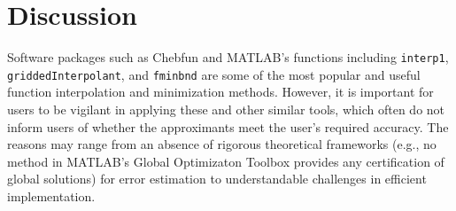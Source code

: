 \documentclass[review]{elsarticle}
\newcommand{\abstol}{\varepsilon}
\theoremstyle{definition}
\newtheorem{exmp}{Example}
\newcommand{\funappxg}{\texttt{funappx\_g}\xspace}
\newcommand{\funming}{\texttt{funmin\_g\xspace}}
\newcommand{\integralg}{\texttt{integral\_g\xspace}}
\begin{document}
\begin{comment}
\begin{exmp}
In this example, we consider the function $f_4(x) = sin(10 \pi x^4) + x$, which
is increasing oscillating over the interval $[0,2]$. We use \funappxg, \funming,
and \integralg to approximate the function, locate its global minimum, and
estimate its integral with $\abstol = 10^{-8}$. With $1,972,359$ points,
\funappxg can approximate $f_4$ uniformly accurate as shown in
Figure~\ref{f4fig}(a). The true global minimum is $(0.6212340312,
-0.3782149854)$ and the absolute approximation error of \funming using
$n=2,022,621$ points is $(1.4\times 10^{-7}, 4.7\times 10^{-11})$. The integral
$\int_{0}^{2} f_4 (x) dx = 2.145517314$ and the approximation error of
\integralg is $4.7\times10^{-10}$ using $4,965,641$ points.

\begin{figure}[bt]
\centering
\texttt{[image: figure/f4\_funappx\_error.eps]} \hspace{-5ex}
\texttt{[image: figure/f4\_funmin\_g.eps]}
\caption{The example $f_4$ with errors of interpolants from \funappxg (left) and
minimum found by \funming (right).}
\label{f4fig}
\end{figure}
\end{exmp}
\end{comment}


\begin{comment}
Our algorithm is readily extensible to the following complex-valued function.
\begin{exmp}
This example is taken from MATLAB's documentation for \texttt{interp1}. Define
the complex valued function $v(x) = 5x + x^2 i$ for $x \in [1,10]$. It is clear
that the real part of $v$ is $5x$ and the imaginary part is $x^2$. We could
apply \funappxg to approximate the two parts separately. However, it is
unnecessary.
\end{exmp}
\end{comment}



\section{Discussion}

Software packages such as Chebfun and MATLAB's functions including
\texttt{interp1}, \texttt{griddedInterpolant}, and \texttt{fminbnd} are some of
the most popular and useful function interpolation and minimization methods.
However, it is important for users to be vigilant in applying these and other
similar tools, which often do not inform users of whether the approximants meet
the user's required accuracy. The reasons may range from an absence of rigorous
theoretical frameworks (e.g., no method in MATLAB's Global Optimizaton Toolbox
provides any certification of global solutions) for error estimation to
understandable challenges in efficient implementation.
\end{document}

